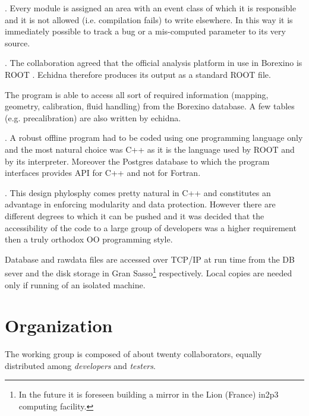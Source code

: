 \item[Data protection]. 
  Every module is assigned an area with an event class of which it is responsible and it is not allowed (i.e. compilation fails) to write elsewhere. 
  In this way it is immediately possible to track a bug or a mis-computed parameter to its very source.

\item[Use of ROOT]. 
  The collaboration agreed that the official analysis platform in use in Borexino is ROOT\cite{???} . Echidna therefore produces its output as a standard ROOT file. 

\item[Use of Database.] 
  The program is able to access all sort of required information (mapping, geometry, calibration, fluid handling) from the Borexino database.
  A few tables (e.g. precalibration) are also written by echidna.

\item[Single language: C++]. 
  A robust offline program had to be coded using one programming language only and the most natural choice was C++ as it is the language used by ROOT and by its interpreter.
  Moreover the Postgres database to which the program interfaces provides API for C++ and not for Fortran.

\item[\emph{Object-Oriented} (OO) programming]. 
  This design phylosphy comes pretty natural in C++ and constitutes an advantage in enforcing modularity and data protection. 
  However there are different degrees to which it can be pushed and it was decided that the accessibility of the code to a large group of developers was a higher requirement then a truly orthodox OO programming style. 

\item[Network oriented.] 
  Database and rawdata files are accessed over TCP/IP at run time from the DB sever and the disk storage in Gran Sasso\footnote{
    In the future it is foreseen building a mirror in the Lion (France) in2p3 computing facility.} respectively.
  Local copies are needed only if running of an isolated machine.
\ede


\section{Organization}
\label{sec:intro_cycles}


The working group is composed of about twenty collaborators, equally distributed among \emph{developers} and \emph{testers}.

